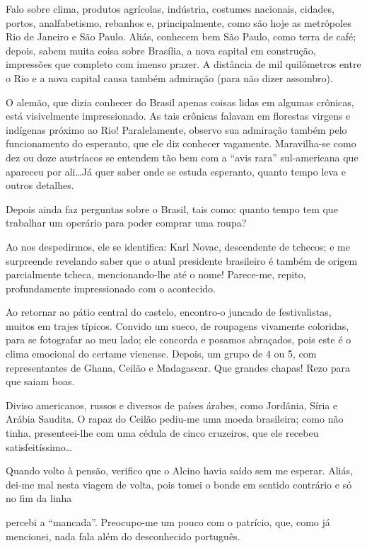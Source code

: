 Falo sobre clima, produtos agrícolas, indústria, costumes nacionais, cidades, portos, analfabetismo, rebanhos e, principalmente, como são hoje as metrópoles Rio de Janeiro e São Paulo. Aliás, conhecem bem São Paulo, como terra de café; depois, sabem muita coisa sobre Brasília, a nova capital em construção, impressões que completo com imenso prazer. A distância de mil quilômetros entre o Rio e a nova capital causa também admiração (para não dizer assombro).

O alemão, que dizia conhecer do Brasil apenas coisas lidas em algumas crônicas, está visivelmente impressionado. As tais crônicas falavam em florestas virgens e indígenas próximo ao Rio! Paralelamente, observo sua admiração também pelo funcionamento do esperanto, que ele diz conhecer vagamente. Maravilha-se como dez ou doze austríacos se entendem tão bem com a “avis rara” sul-americana que apareceu por ali\ldots Já quer saber onde se estuda esperanto, quanto tempo leva e outros detalhes.

Depois ainda faz perguntas sobre o Brasil, tais como: quanto tempo tem que trabalhar um operário para poder comprar uma roupa?

Ao nos despedirmos, ele se identifica: Karl Novac, descendente de tchecos; e me surpreende revelando saber que o atual presidente brasileiro é também de origem parcialmente tcheca, mencionando-lhe até o nome! Parece-me, repito, profundamente impressionado com o acontecido.

Ao retornar ao pátio central do castelo, encontro-o juncado de festivalistas, muitos em trajes típicos. Convido um sueco, de roupagens vivamente coloridas, para se fotografar ao meu lado; ele concorda e posamos abraçados, pois este é o clima emocional do certame vienense. Depois, um grupo de 4 ou 5, com representantes de Ghana, Ceilão e Madagascar. Que grandes chapas! Rezo para que saiam boas.

Diviso americanos, russos e diversos de países árabes, como Jordânia, Síria e Arábia Saudita. O rapaz do Ceilão pediu-me uma moeda brasileira; como não tinha, presenteei-lhe com uma cédula de cinco cruzeiros, que ele recebeu satisfeitíssimo\ldots

Quando volto à pensão, verifico que o Alcino havia saído sem me esperar. Aliás, dei-me mal nesta viagem de volta, pois tomei o bonde em sentido contrário e só no fim da linha

percebi a “mancada”. Preocupo-me um pouco com o patrício, que, como já mencionei, nada fala além do desconhecido português.

